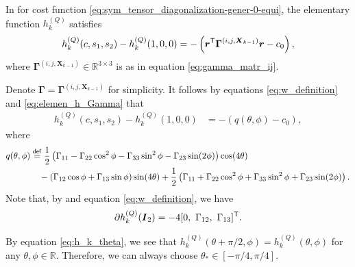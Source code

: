 \documentclass[final,onefignum,onetabnum]{siamart190516}
\newcommand{\matr}[1]{\boldsymbol{#1}}
\newcommand{\vect}[1]{\boldsymbol{#1}}
\newcommand{\T}{{\sf T}} %
\newcommand{\eqdef}{\stackrel{\sf def}{=}}
\newcommand{\RR}{\mathbb{R}}
\newcommand{\Gamij}[3]{\matr{\Gamma}^{(#1,#2,#3)}}
\begin{document}
\begin{lemma}\label{lemm:elemen_express_c_1}
In  for cost function \cref{eq:sym_tensor_diagonalization-gener-0-equi},
the elementary function $h^{(Q)}_k$ satisfies 
\begin{align}\label{eq:elemen_h_Gamma}
h^{(Q)}_k(c,s_1,s_2) - h^{(Q)}_k(1,0,0) =
-\left(\vect{r}^{\T}\Gamij{i}{j}{\matr{X}_{k-1}}\vect{r} - c_0\right),
\end{align}
where $\Gamij{i}{j}{\matr{X}_{k-1}}\in\RR^{3\times 3}$ is as in equation \cref{eq:gamma_matr_ij}.
\end{lemma}

Denote $\matr{\Gamma}=\Gamij{i}{j}{\matr{X}_{k-1}}$ for simplicity. 
It follows by equations \cref{eq:w_definition} and \cref{eq:elemen_h_Gamma} that
\begin{align}
h^{(Q)}_k(c,s_1,s_2) - h^{(Q)}_k(1,0,0) &= -\left(q(\theta,\phi)-c_0\right),\label{eq:h_k_theta}
\end{align}
where {\small
\begin{align}\label{eq:q_tehta}
q(\theta,\phi)&\eqdef  \frac{1}{2}\left(\Gamma_{11}-\Gamma_{22}\cos^2\phi-\Gamma_{33}\sin^2\phi-\Gamma_{23}\sin(2\phi)\right)\cos(4\theta)\notag\\ &\quad-\left(\Gamma_{12}\cos\phi+\Gamma_{13}\sin\phi\right)\sin(4\theta)
+\frac{1}{2}\left(\Gamma_{11}+\Gamma_{22}\cos^2\phi+\Gamma_{33}\sin^2\phi+\Gamma_{23}\sin(2\phi)\right).
\end{align}}
Note that, by  and equation \cref{eq:w_definition}, we have
\begin{align}\label{eq:partial_h_k}
\partial h^{(Q)}_k(\matr{I}_2) 
=-4 [0,\ \Gamma_{12},\ \Gamma_{13}]^\T.
\end{align}


\begin{remark}
By equation \cref{eq:h_k_theta}, we see that $h^{(Q)}_k(\theta+\pi/{2},\phi)=h^{(Q)}_k(\theta,\phi)$ for any $\theta,\phi\in\RR$.
Therefore, we can always choose  $\theta_{*}\in[-\pi/{4},\pi/{4}]$. 
\end{remark}
\end{document}
